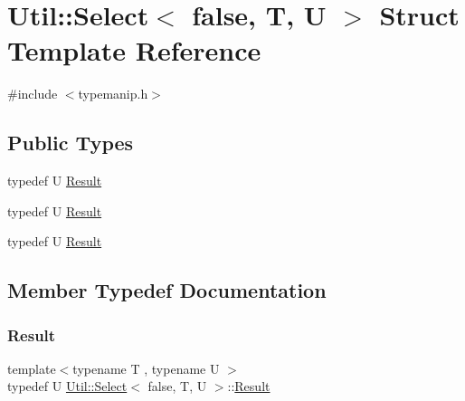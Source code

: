 \hypertarget{structUtil_1_1Select_3_01false_00_01T_00_01U_01_4}{}\section{Util\+:\+:Select$<$ false, T, U $>$ Struct Template Reference}
\label{structUtil_1_1Select_3_01false_00_01T_00_01U_01_4}


{\ttfamily \#include $<$typemanip.\+h$>$}

\subsection*{Public Types}
\begin{DoxyCompactItemize}
\item 
typedef U \mbox{\hyperlink{structUtil_1_1Select_3_01false_00_01T_00_01U_01_4_a0fae7c144e474e3297046018b97cd287}{Result}}
\item 
typedef U \mbox{\hyperlink{structUtil_1_1Select_3_01false_00_01T_00_01U_01_4_a0fae7c144e474e3297046018b97cd287}{Result}}
\item 
typedef U \mbox{\hyperlink{structUtil_1_1Select_3_01false_00_01T_00_01U_01_4_a0fae7c144e474e3297046018b97cd287}{Result}}
\end{DoxyCompactItemize}


\subsection{Member Typedef Documentation}
\mbox{\label{structUtil_1_1Select_3_01false_00_01T_00_01U_01_4_a0fae7c144e474e3297046018b97cd287}} 
\subsubsection{\texorpdfstring{Result}{Result}\hspace{0.1cm}{\footnotesize\ttfamily [1/3]}}
{\footnotesize\ttfamily template$<$typename T , typename U $>$ \\
typedef U \mbox{\hyperlink{structUtil_1_1Select}{Util\+::\+Select}}$<$ false, T, U $>$\+::\mbox{\hyperlink{structUtil_1_1Select_3_01false_00_01T_00_01U_01_4_a0fae7c144e474e3297046018b97cd287}{Result}}}

